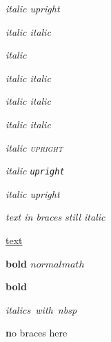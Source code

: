 \documentclass[12pt]{article}
\newcommand\"{quote}
\begin{document}
\textit{italic \emph{upright}}

\textit{italic \textsf{italic}}

\textit{italic }

\textit{italic \textrm{italic}}

\textit{italic \textsl{italic}}

\textsl{italic \textit{italic}}

\textit{italic \textsc{upright}}

\textsl{italic \texttt{upright}}

\textit{italic \textnormal{upright}}

\textit{text {in braces} still italic}

\underline{text}


\textbf{bold $normal math$}

\textbf{bold %
}

\textit{italics~with~nbsp}

\textbf no braces here
\end{document}

